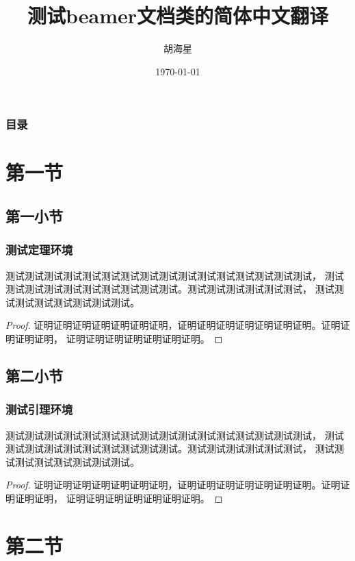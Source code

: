 \documentclass[10pt,serif,t]{beamer}
\title{\heiti{}测试beamer文档类的简体中文翻译}
\author{\songti{}胡海星}
\institute{\kaishu{}计算机科学与技术系\\
           南京大学}
\date{\today}
\begin{document}

\begin{frame}
    \titlepage
\end{frame}

\begin{frame}
  \frametitle{目录}
  \tableofcontents
\end{frame}

\section{第一节}

\subsection{第一小节}

\begin{frame}
  \frametitle{测试定理环境}
  \begin{theorem}
    测试测试测试测试测试测试测试测试测试测试测试测试测试测试测试测试，
    测试测试测试测试测试测试测试测试测试测试。测试测试测试测试测试测试，
    测试测试测试测试测试测试测试测试。
  \end{theorem}
  \begin{proof}
    证明证明证明证明证明证明证明，证明证明证明证明证明证明证明。证明证明证明证明，
    证明证明证明证明证明证明证明。
  \end{proof}
\end{frame}

\subsection{第二小节}

\begin{frame}
  \frametitle{测试引理环境}
  \begin{lemma}
    测试测试测试测试测试测试测试测试测试测试测试测试测试测试测试测试，
    测试测试测试测试测试测试测试测试测试测试。测试测试测试测试测试测试，
    测试测试测试测试测试测试测试测试。
  \end{lemma}
  \begin{proof}
    证明证明证明证明证明证明证明，证明证明证明证明证明证明证明。证明证明证明证明，
    证明证明证明证明证明证明证明。
  \end{proof}
\end{frame}

\section{第二节}
\end{document}
